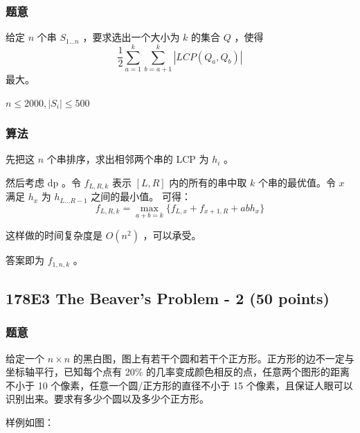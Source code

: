 \documentclass[11pt]{article}
\begin{document}
\subsubsection{题意}
\label{sec-10-5-1}

    给定 $n$ 个串 $S_{1 \dots n}$ ，要求选出一个大小为 $k$ 的集合 $Q$ ，使得
    $$\frac{1}{2}\sum_{a = 1}^k \sum_{b = a + 1}^k |LCP (Q_a, Q_b)|$$
    最大。

    $n \leq 2000, |S_i| \leq 500$
\subsubsection{算法}
\label{sec-10-5-2}

    先把这 $n$ 个串排序，求出相邻两个串的 LCP 为 $h_i$ 。

    然后考虑 dp 。令 $f_{L, R, k}$ 表示 $[L, R]$ 内的所有的串中取 $k$ 个串的最优值。令 $x$ 满足 $h_x$ 为 $h_{L \dots R - 1}$ 之间的最小值。 可得：
    $$f_{L, R, k} = \max_{a + b = k}\{f_{L, x} + f_{x + 1, R} + a b h_x\}$$

    这样做的时间复杂度是 $O(n^2)$ ，可以承受。

    答案即为 $f_{1, n, k}$ 。
\subsection{178E3 The Beaver's Problem - 2 (50 points)}
\label{sec-10-6}
\subsubsection{题意}
\label{sec-10-6-1}

    给定一个 $n \times n$ 的黑白图，图上有若干个圆和若干个正方形。正方形的边不一定与坐标轴平行，已知每个点有 20\% 的几率变成颜色相反的点，任意两个图形的距离不小于 10 个像素，任意一个圆/正方形的直径不小于 15 个像素，且保证人眼可以识别出来。要求有多少个圆以及多少个正方形。

    样例如图：
\end{document}
